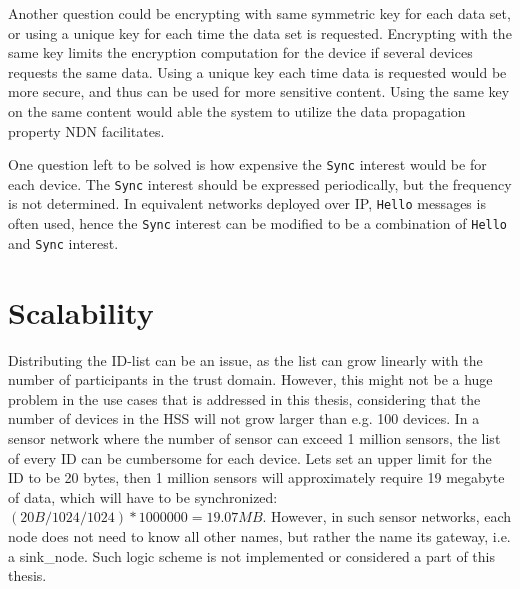 Another question could be encrypting with same symmetric key for each data set, or using a unique key for each time the data set is requested.
Encrypting with the same key limits the encryption computation for the device if several devices requests the same \gls{data}.
Using a unique key each time \gls{data} is requested would be more secure, and thus can be used for more sensitive content.
Using the same key on the same content would able the system to utilize the data propagation property \gls{NDN} facilitates.

One question left to be solved is how expensive the \texttt{Sync} \gls{interest} would be for each device. 
The \texttt{Sync} \gls{interest} should be expressed periodically, but the frequency is not determined. 
In equivalent networks deployed over \gls{IP}, \texttt{Hello} messages is often used, hence the \texttt{Sync} \gls{interest} can be modified to be a combination of \texttt{Hello} and \texttt{Sync} \gls{interest}.

\section{Scalability}
Distributing the \gls{ID}-list can be an issue, as the list can grow linearly with the number of participants in the trust domain.
However, this might not be a huge problem in the use cases that is addressed in this thesis, considering that the number of devices in the \gls{HSS} will not grow larger than e.g. 100 devices. 
In a sensor network where the number of sensor can exceed 1 million sensors, the list of every ID can be cumbersome for each device.
Lets set an upper limit for the ID to be 20 bytes, then 1 million sensors will approximately require 19 megabyte of data, which will have to be synchronized:
$(20B / 1024 / 1024) * 1 000 000 = 19.07MB$.
However, in such sensor networks, each node does not need to know all other names, but rather the name its gateway, i.e. a \gls{sink_node}. 
Such logic scheme is not implemented or considered a part of this thesis.

